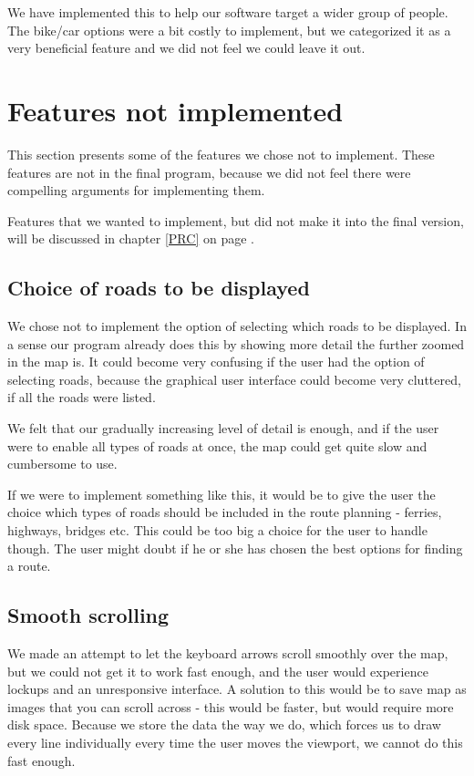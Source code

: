 We have implemented this to help our software target a wider group of people.
The bike/car options were a bit costly to implement, but we categorized it as a
very beneficial feature and we did not feel we could leave it out.

\section{Features not implemented}
\label{UIA-NI}
This section presents some of the features we chose not to implement.
These features are not in the final program, because we did not feel there were
compelling arguments for implementing them.

Features that we wanted to implement, but did not make it into the final version,
will be discussed in chapter \ref{PRC}  on page
\pageref{PRC}.

\subsection{Choice of roads to be displayed}
\label{UIA-NI-CRD}
We chose not to implement the option of selecting which roads to be displayed.
In a sense our program already does this by showing more detail the further
zoomed in the map is. It could become very confusing if the user had the option
of selecting roads, because the graphical user interface could become very
cluttered, if all the roads were listed.

We felt that our gradually increasing level of detail is enough, and if the user were 
to enable all types of roads at once, the map could get quite slow and cumbersome 
to use.

If we were to implement something like this, it would be to give the user the choice 
which types of roads should be included in the route planning - ferries, highways, 
bridges etc. This could be too big a choice for the user to handle though. The
user might doubt if he or she has chosen the best options for finding a route.

\subsection{Smooth scrolling}
\label{UIA-NI-SS}
We made an attempt to let the keyboard arrows scroll smoothly over the map, but
we could not get it to work fast enough, and the user would experience
lockups and an unresponsive interface. A solution to this would
be to save map as images that you can scroll across - this would be faster, but
would require more disk space. Because we store the data the way we do, which 
forces us to draw every line individually every time the user moves the viewport, 
we cannot do this fast enough.


